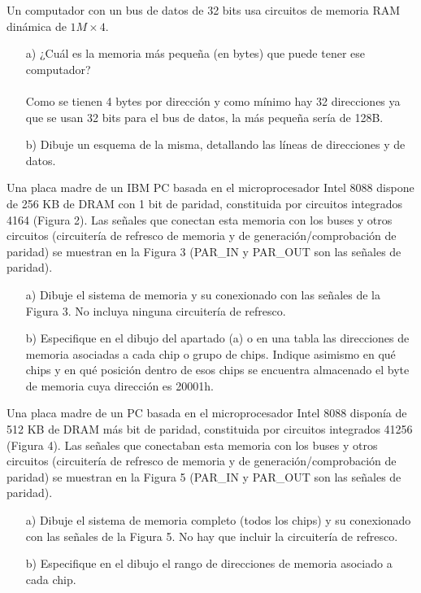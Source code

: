 \begin{ejercicio}
    Un computador con un bus de datos de 32 bits usa circuitos de memoria RAM dinámica de \( 1M \times 4 \).
    \begin{itemize}
        \item[a)] ¿Cuál es la memoria más pequeña (en bytes) que puede tener ese computador?
            \\ \\
            Como se tienen 4 bytes por dirección y como mínimo hay 32 direcciones ya que se usan 32 bits para el bus de datos, 
            la más pequeña sería de 128B.
        \item[b)] Dibuje un esquema de la misma, detallando las líneas de direcciones y de datos.
    \end{itemize}
\end{ejercicio}

\begin{ejercicio}
    Una placa madre de un IBM PC basada en el microprocesador Intel 8088 dispone de 256 KB de DRAM con 1 bit de paridad, constituida por circuitos integrados 4164 (Figura 2). Las señales que conectan esta memoria con los buses y otros circuitos (circuitería de refresco de memoria y de generación/comprobación de paridad) se muestran en la Figura 3 (PAR\_IN y PAR\_OUT son las señales de paridad).
    \begin{itemize}
        \item[a)] Dibuje el sistema de memoria y su conexionado con las señales de la Figura 3. No incluya ninguna circuitería de refresco.
        \item[b)] Especifique en el dibujo del apartado (a) o en una tabla las direcciones de memoria asociadas a cada chip o grupo de chips. Indique asimismo en qué chips y en qué posición dentro de esos chips se encuentra almacenado el byte de memoria cuya dirección es 20001h.
    \end{itemize}
\end{ejercicio}

\begin{ejercicio}
    Una placa madre de un PC basada en el microprocesador Intel 8088 disponía de 512 KB de DRAM más bit de paridad, constituida por circuitos integrados 41256 (Figura 4). Las señales que conectaban esta memoria con los buses y otros circuitos (circuitería de refresco de memoria y de generación/comprobación de paridad) se muestran en la Figura 5 (PAR\_IN y PAR\_OUT son las señales de paridad).
    \begin{itemize}
        \item[a)] Dibuje el sistema de memoria completo (todos los chips) y su conexionado con las señales de la Figura 5. No hay que incluir la circuitería de refresco.
        \item[b)] Especifique en el dibujo el rango de direcciones de memoria asociado a cada chip.
    \end{itemize}
\end{ejercicio}

